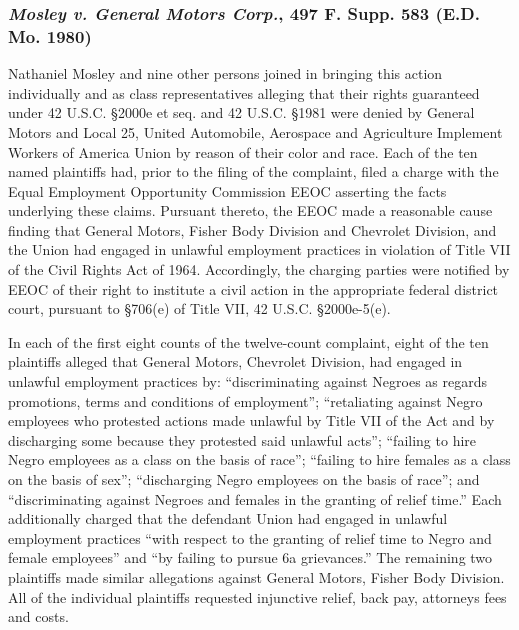 \documentclass[11pt,letterpaper,twoside]{article}
\begin{document}
\subsubsection{\texorpdfstring{\emph{Mosley v. General Motors Corp.},
497 F. Supp. 583 (E.D. Mo.
1980)}{Mosley v. General Motors Corp., 497 F. Supp. 583 (E.D. Mo. 1980)}}\label{mosleygeneralmotorscorp_edmo1980}

Nathaniel Mosley and nine other persons joined in bringing this action
individually and as class representatives alleging that their rights
guaranteed under 42 U.S.C. §2000e et seq. and 42 U.S.C. §1981 were
denied by General Motors and Local 25, United Automobile, Aerospace and
Agriculture Implement Workers of America Union by reason of their color
and race. Each of the ten named plaintiffs had, prior to the filing of
the complaint, filed a charge with the Equal Employment Opportunity
Commission EEOC asserting the facts underlying these claims. Pursuant
thereto, the EEOC made a reasonable cause finding that General Motors,
Fisher Body Division and Chevrolet Division, and the Union had engaged
in unlawful employment practices in violation of Title VII of the Civil
Rights Act of 1964. Accordingly, the charging parties were notified by
EEOC of their right to institute a civil action in the appropriate
federal district court, pursuant to §706(e) of Title VII, 42 U.S.C.
§2000e-5(e).

In each of the first eight counts of the twelve-count complaint, eight
of the ten plaintiffs alleged that General Motors, Chevrolet Division,
had engaged in unlawful employment practices by: ``discriminating
against Negroes as regards promotions, terms and conditions of
employment''; ``retaliating against Negro employees who protested
actions made unlawful by Title VII of the Act and by discharging some
because they protested said unlawful acts''; ``failing to hire Negro
employees as a class on the basis of race''; ``failing to hire females
as a class on the basis of sex''; ``discharging Negro employees on the
basis of race''; and ``discriminating against Negroes and females in the
granting of relief time.'' Each additionally charged that the defendant
Union had engaged in unlawful employment practices ``with respect to the
granting of relief time to Negro and female employees'' and ``by failing
to pursue 6a grievances.'' The remaining two plaintiffs made similar
allegations against General Motors, Fisher Body Division. All of the
individual plaintiffs requested injunctive relief, back pay, attorneys
fees and costs.
\end{document}

